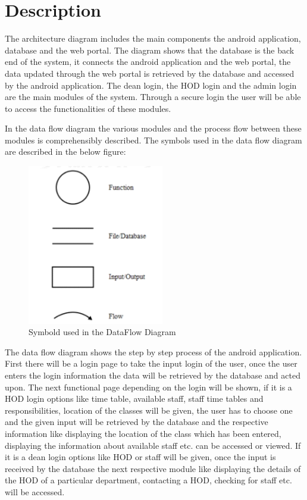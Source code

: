 \documentclass[BTech]{srmuthesis}
\begin{document}
\section{Description}
The architecture diagram includes the main components the android application, database and the web portal. The diagram shows that the database is the back end of the system, it connects the android application and the web portal, the data updated through the web portal is retrieved by the database and accessed by the android application. 
The dean login, the HOD login and the admin login are the main modules of the system. Through a secure login the user will be able to access the functionalities of these modules. 

In the data flow diagram the various modules and the process flow between these modules is comprehensibly described.
The symbols used in the data flow diagram are described in the below figure:
\begin{figure}[htbp]
	\centering
	\includegraphics[width=\linewidth, height=7cm,keepaspectratio]{desc}
	\caption{Symbold used in the DataFlow Diagram}
	\label{fig:sym}
\end{figure}
The data flow diagram shows the step by step process of the android application. First there will be a login page to take the input login of the user, once the user enters the login information the data will be retrieved by the database and acted upon. The next functional page depending on the login will be shown, if it is a HOD login options like time table, available staff, staff time tables and responsibilities, location of the classes will be given, the user has to choose one and the given input will be retrieved by the database and the respective information like displaying the location of the class which has been entered, displaying the information about available staff etc. can be accessed or viewed. If it is a dean login options like HOD or staff will be given, once the input is received by the database the next respective module like displaying the details of the HOD of a particular department, contacting a HOD, checking for staff etc. will be accessed.
\end{document}

